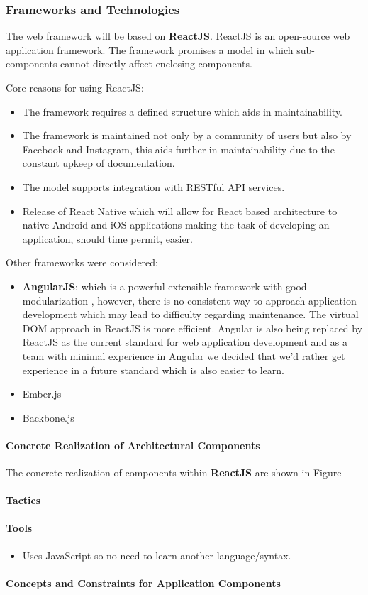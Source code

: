 \subsubsection{Frameworks and Technologies}
The web framework will be based on \textbf{ReactJS}. ReactJS is an open-source web
application framework. The framework promises a model in which sub-components
cannot directly affect enclosing components.

Core reasons for using ReactJS:
\begin{itemize}
	\item The framework requires a defined structure which aids in maintainability.
	\item The framework is maintained not only by a community of users but also
	by Facebook and Instagram, this aids further in maintainability due to the 
	constant upkeep of documentation.
	\item The model supports integration with RESTful API services.
	\item Release of React Native which will allow for React based architecture 
	to native Android and iOS applications making the task of developing an 
	application, should time permit, easier.
\end{itemize}
Other frameworks were considered;
\begin{itemize}
	\item \textbf{AngularJS}: which is a powerful extensible framework with good modularization
, however, there is no consistent way to approach application development which may 
lead to difficulty regarding maintenance. The virtual DOM approach in ReactJS is more
efficient. Angular is also being replaced by ReactJS as the current standard for web 
application development and as a team with minimal experience in Angular we decided 
that we'd rather get experience in a future standard which is also easier to learn.
	\item Ember.js
	\item Backbone.js
\end{itemize}

\paragraph{Concrete Realization of Architectural Components}
The concrete realization of components within \textbf{ReactJS} are shown in Figure
\paragraph{Tactics}
\paragraph{Tools}
\begin{itemize}
	\item Uses JavaScript so no need to learn another language/syntax.
\end{itemize}
\paragraph{Concepts and Constraints for Application Components}